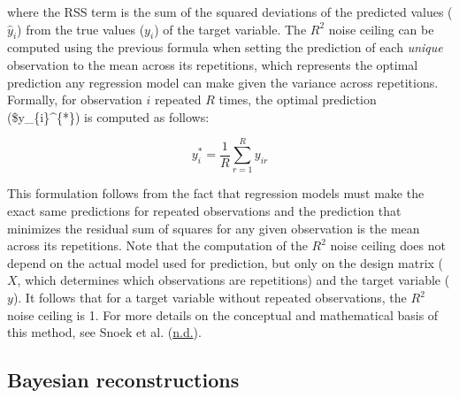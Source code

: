 \documentclass[11pt,american,a4paper,oneside,]{memoir} %
\begin{document}
where the RSS term is the sum of the squared deviations of the predicted values (\(\hat{y}_{i}\)) from the true values (\(y_{i}\)) of the target variable. The \(R^{2}\) noise ceiling can be computed using the previous formula when setting the prediction of each \emph{unique} observation to the mean across its repetitions, which represents the optimal prediction any regression model can make given the variance across repetitions. Formally, for observation \(i\) repeated \(R\) times, the optimal prediction (\$y\_\{i\}\^{}\{*\}) is computed as follows:

\begin{equation}
y_{i}^{*} = \frac{1}{R}\sum_{r=1}^{R}y_{ir}
\end{equation}

This formulation follows from the fact that regression models must make the exact same predictions for repeated observations and the prediction that minimizes the residual sum of squares for any given observation is the mean across its repetitions. Note that the computation of the \(R^{2}\) noise ceiling does not depend on the actual model used for prediction, but only on the design matrix (\(X\), which determines which observations are repetitions) and the target variable (\(y\)). It follows that for a target variable without repeated observations, the \(R^{2}\) noise ceiling is 1. For more details on the conceptual and mathematical basis of this method, see Snoek et al. (\protect\hyperlink{ref-snoek-submitted}{n.d.}).

\hypertarget{svsd-bayes}{%
\subsection{Bayesian reconstructions}\label{svsd-bayes}}
\end{document}
